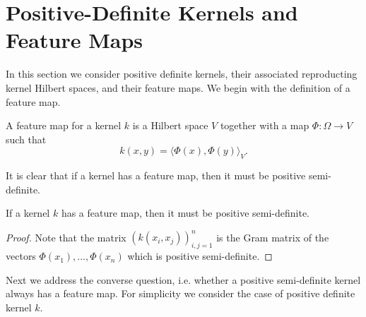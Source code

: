 \section{Positive-Definite Kernels and Feature Maps}
In this section we consider positive definite kernels, their associated reproducting kernel Hilbert spaces, and their feature maps. We begin with the definition of a feature map.
\begin{definition}
 A feature map for a kernel $k$ is a Hilbert space $V$ together with a map $\Phi:\Omega\rightarrow V$ such that
 \begin{equation}
  k(x,y) = \langle\Phi(x), \Phi(y)\rangle_V.
 \end{equation}

\end{definition}
It is clear that if a kernel has a feature map, then it must be positive semi-definite.
\begin{lemma}
 If a kernel $k$ has a feature map, then it must be positive semi-definite.
\end{lemma}
\begin{proof}
 Note that the matrix $(k(x_i,x_j))_{i,j=1}^n$ is the Gram matrix of the vectors $\Phi(x_1),...,\Phi(x_n)$ which is positive semi-definite.
\end{proof}

Next we address the converse question, i.e. whether a positive semi-definite kernel always has a feature map. For simplicity we consider the case of positive definite kernel $k$.

